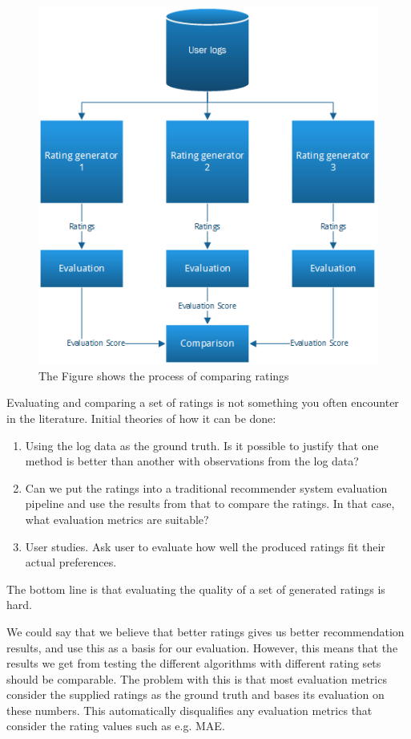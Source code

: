 \begin{figure}[H]
		\centering
	  	\includegraphics[height=0.65\linewidth]{image/ratinggeneval.png}
		\caption[Comparing Ratings]{The Figure shows the process of comparing ratings}
		\label{figure:compareratings}
\end{figure}

Evaluating and comparing a set of ratings is not something you often encounter in the literature.
Initial theories of how it can be done:

\begin{enumerate}
\item Using the log data as the ground truth. Is it possible to justify that one method is better than another with observations from the log data?
\item Can we put the ratings into a traditional recommender system evaluation pipeline and use the results from that to compare the ratings. In that case, what evaluation metrics are suitable?
\item User studies. Ask user to evaluate how well the produced ratings fit their actual preferences.
\end{enumerate}

The bottom line is that evaluating the quality of a set of generated ratings is hard. 



We could say that we believe that better ratings gives us better recommendation results, and use this as a basis for our evaluation. However, this means that the results we get from testing the different algorithms with different rating sets should be comparable. The problem with this is that most evaluation metrics consider the supplied ratings as the ground truth and bases its evaluation on these numbers. This automatically disqualifies any evaluation metrics that consider the rating values such as e.g. MAE.


